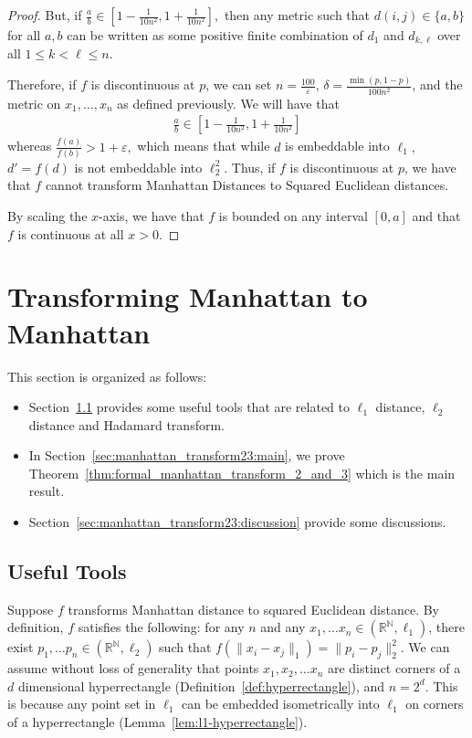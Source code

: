 \begin{proof}
  But, if $\frac{a}{b} \in \left[1 - \frac{1}{10 n^2}, 1 + \frac{1}{10 n^2}\right],$ then any metric such that $d(i, j) \in \{a, b\}$  
  for all $a, b$ can be written as some positive finite combination of $d_1$ and $d_{k, \ell}$ over all $1 \le k < \ell \le n$.
  
  Therefore, if $f$ is discontinuous at $p$, we can set $n = \frac{100}{\varepsilon}$, $\delta = \frac{\min(p, 1-p)}{100 n^2}$, and the metric on $x_1, \dots, x_n$ as defined previously. We will have that 
  \begin{align*}
  \frac{a}{b} \in \left[1 - \frac{1}{10 n^2}, 1 + \frac{1}{10 n^2}\right] 
  \end{align*}
  whereas $\frac{f(a)}{f(b)} > 1+\varepsilon,$ which means that while $d$ is embeddable into $\ell_1,$ $d' = f(d)$ is not embeddable into $\ell_2^2$. Thus, if $f$ is discontinuous at $p$, we have that $f$ cannot transform Manhattan Distances to Squared Euclidean distances.
  
  By scaling the $x$-axis, we have that $f$ is bounded on any interval $[0, a]$ and that $f$ is continuous at all $x > 0$.
  \end{proof}


\section{Transforming Manhattan to Manhattan}\label{sec:manhattan_transform23}

This section is organized as follows:
\begin{itemize}
    \item Section~\ref{sec:manhattan_transform23:tools} provides some useful tools that are related to $\ell_1$ distance, $\ell_2$ distance and Hadamard transform.
    \item In Section~\ref{sec:manhattan_transform23:main}, we prove Theorem~\ref{thm:formal_manhattan_transform_2_and_3} which is the main result.
    \item Section~\ref{sec:manhattan_transform23:discussion} provide some discussions.
\end{itemize}

\subsection{Useful Tools}\label{sec:manhattan_transform23:tools}
Suppose $f$ transforms Manhattan distance to squared Euclidean distance. By definition, $f$ satisfies the following: for any $n$ and any $x_1, \ldots x_n \in
(\mathbb{R}^{\mathbb{N}}, \ell_1)$, 
there exist $p_1, \ldots p_n \in (\mathbb{R}^{\mathbb{N}}, \ell_2)$ such that $f(\|x_i -
    x_j\|_1) = \|p_i - p_j\|_2^2$.  We can assume
without loss of generality that points $x_1, x_2, \ldots x_n$ are distinct corners of a $d$ dimensional
hyperrectangle (Definition~\ref{def:hyperrectangle}), and $n = 2^d$. This is because any point set in $\ell_1$ can be
embedded isometrically into $\ell_1$ on corners of a hyperrectangle
(Lemma~\ref{lem:l1-hyperrectangle}).

